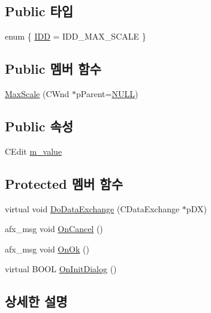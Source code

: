 \subsection*{Public 타입}
\begin{DoxyCompactItemize}
\item 
enum \{ \mbox{\hyperlink{class_max_scale_a2584d0e001acfcc3d5381fcfa28802d1abe3c08f7c43ce9c923a676f61a12a09e}{I\+DD}} = I\+D\+D\+\_\+\+M\+A\+X\+\_\+\+S\+C\+A\+LE
 \}
\end{DoxyCompactItemize}
\subsection*{Public 멤버 함수}
\begin{DoxyCompactItemize}
\item 
\mbox{\hyperlink{class_max_scale_ac641f139272a4259f94f058bfeffa502}{Max\+Scale}} (C\+Wnd $\ast$p\+Parent=\mbox{\hyperlink{_system_8h_a070d2ce7b6bb7e5c05602aa8c308d0c4}{N\+U\+LL}})
\end{DoxyCompactItemize}
\subsection*{Public 속성}
\begin{DoxyCompactItemize}
\item 
C\+Edit \mbox{\hyperlink{class_max_scale_a95c50937477be6af50f60f022b5fd4f8}{m\+\_\+value}}
\end{DoxyCompactItemize}
\subsection*{Protected 멤버 함수}
\begin{DoxyCompactItemize}
\item 
virtual void \mbox{\hyperlink{class_max_scale_a662145e5302d2f9ecf0beb9cb59badf6}{Do\+Data\+Exchange}} (C\+Data\+Exchange $\ast$p\+DX)
\item 
afx\+\_\+msg void \mbox{\hyperlink{class_max_scale_a2adeba2f4a8d4371f8c8f301a44c0b3b}{On\+Cancel}} ()
\item 
afx\+\_\+msg void \mbox{\hyperlink{class_max_scale_a3769f394432ad37e3d631434333d6141}{On\+Ok}} ()
\item 
virtual B\+O\+OL \mbox{\hyperlink{class_max_scale_a7d3d960c9c4846d318a878dec66cf8c5}{On\+Init\+Dialog}} ()
\end{DoxyCompactItemize}


\subsection{상세한 설명}


